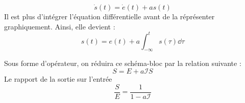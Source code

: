 \[
    \dot{s}(t)=\dot{e}(t)+as(t)
\]
Il est plus d'intégrer l'équation différentielle avant de la réprésenter
graphiquement. Ainsi, elle devient :
\[
    s(t)=e(t)+a\int_{-\infty}^t s(\tau) \dd{\tau}
\]
\begin{center}
    
\end{center}
Sous forme d'opérateur, on réduira ce schéma-bloc par 
la relation suivante :
\[
    S=E+a\mathcal{I}S
\]
Le rapport de la sortie sur l'entrée
\[
    \dfrac{S}{E}=\dfrac{1}{1-a\mathcal{I}}
\]
